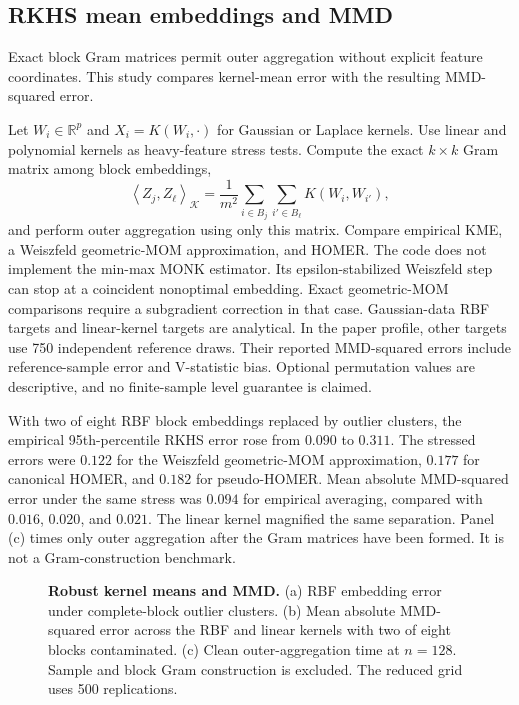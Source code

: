 \documentclass[twoside]{article}
\theoremstyle{definition}
\newcommand{\R}{\mathbb R}
\newcommand{\ip}[2]{\left\langle #1,#2\right\rangle}
\begin{document}
\subsection{RKHS mean embeddings and MMD}

Exact block Gram matrices permit outer aggregation without explicit feature coordinates. This study compares kernel-mean error with the resulting MMD-squared error.

Let $W_i\in\R^p$ and $X_i=K(W_i,\cdot)$ for Gaussian or Laplace kernels. Use linear and polynomial kernels as heavy-feature stress tests. Compute the exact $k\times k$ Gram matrix among block embeddings,
\[
    \ip{Z_j}{Z_\ell}_{\mathcal K}
    =\frac1{m^2}\sum_{i\in B_j}\sum_{i'\in B_\ell}K(W_i,W_{i'}),
\]
and perform outer aggregation using only this matrix. Compare empirical KME, a Weiszfeld geometric-MOM approximation, and HOMER. The code does not implement the min-max MONK estimator. Its epsilon-stabilized Weiszfeld step can stop at a coincident nonoptimal embedding. Exact geometric-MOM comparisons require a subgradient correction in that case. Gaussian-data RBF targets and linear-kernel targets are analytical. In the paper profile, other targets use 750 independent reference draws. Their reported MMD-squared errors include reference-sample error and V-statistic bias. Optional permutation values are descriptive, and no finite-sample level guarantee is claimed.

With two of eight RBF block embeddings replaced by outlier clusters, the empirical 95th-percentile RKHS error rose from $0.090$ to $0.311$. The stressed errors were $0.122$ for the Weiszfeld geometric-MOM approximation, $0.177$ for canonical HOMER, and $0.182$ for pseudo-HOMER. Mean absolute MMD-squared error under the same stress was $0.094$ for empirical averaging, compared with $0.016$, $0.020$, and $0.021$. The linear kernel magnified the same separation. Panel (c) times only outer aggregation after the Gram matrices have been formed. It is not a Gram-construction benchmark.

\begin{figure}[t]
\centering
\resizebox{\textwidth}{!}{}
\caption{\textbf{Robust kernel means and MMD.}
(a) RBF embedding error under complete-block outlier clusters. (b) Mean absolute MMD-squared error across the RBF and linear kernels with two of eight blocks contaminated. (c) Clean outer-aggregation time at $n=128$. Sample and block Gram construction is excluded. The reduced grid uses 500 replications.}
\label{fig:rkhs-embeddings}
\end{figure}
\end{document}
